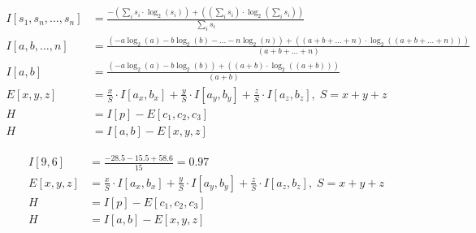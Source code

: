 \documentclass[
	final,
	a4paper,
	oneside,
	parskip=half,
	headings=standardclasses,
	headings=big,
	pointednumbers,
    fleqn
]{scrartcl}
\newcommand{\f}[2]{\frac{#1}{#2}}
\newcommand{\kl}[1]{{\left( #1 \right)}}
\newcommand{\ks}[1]{{\left[ #1 \right]}}
\begin{document}
    \begin{align*}
        I\ks{s_1, s_n, \ldots, s_n} &= \f{-\kl{\sum_{i} s_i \cdot \log_2\kl{s_i}} +
                                       \kl{ \kl{\sum_{i} s_i} \cdot \log_2 \kl{\sum_{i} s_i}}}
                                       {\sum_{i} s_i} \\
        I\ks{a, b, \ldots, n}       &= \f{\kl{- a \log_2\kl{a} - b \log_2\kl{b} - \ldots - n \log_2\kl{n}} +
                                       \kl{ \kl{a + b + \ldots + n} \cdot \log_2 \kl{\kl{a + b + \ldots + n}}}}
                                       {\kl{a + b + \ldots + n}} \\
        I\ks{a, b}                  &= \f{\kl{- a \log_2\kl{a} - b \log_2\kl{b}} +
                                       \kl{ \kl{a + b} \cdot \log_2 \kl{\kl{a + b}}}}
                                       {\kl{a + b}} \\
        E\ks{x, y, z}               &= \f{x}{S} \cdot I \ks{a_x, b_x} + \f{y}{S} \cdot I \ks{a_y, b_y} + \f{z}{S} \cdot I \ks{a_z, b_z}, \; S = x + y + z \\
        H                           &= I\ks{p} - E\ks{c_1, c_2, c_3} \\
        H                           &= I\ks{a,b} - E\ks{x,y,z}
    \end{align*}

    \newpage

    \begin{align*}
        I\ks{9, 6}                  &= \f{-28.5 - 15.5 + 58.6}{15} = 0.97 \\
        E\ks{x, y, z}               &= \f{x}{S} \cdot I \ks{a_x, b_x} + \f{y}{S} \cdot I \ks{a_y, b_y} + \f{z}{S} \cdot I \ks{a_z, b_z}, \; S = x + y + z \\
        H                           &= I\ks{p} - E\ks{c_1, c_2, c_3} \\
        H                           &= I\ks{a,b} - E\ks{x,y,z}
    \end{align*}


    
\end{document}

